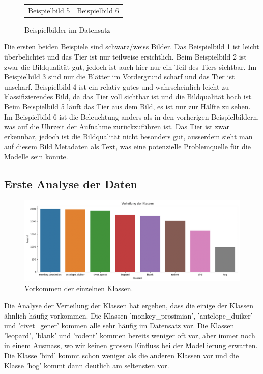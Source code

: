 \documentclass{article}
\begin{document}
\begin{figure}[!h]
\begin{tabular}{cc}
Beispielbild 5 & Beispielbild 6 \\[6pt]
\end{tabular}
\caption{\label{fig:random_pictures}Beispielbilder im Datensatz}
\end{figure}

Die ersten beiden Beispiele sind schwarz/weiss Bilder. Das Beispielbild 1 ist leicht überbelichtet und das Tier ist nur teilweise ersichtlich. Beim Beispielbild 2 ist zwar die Bildqualität gut, jedoch ist auch hier nur ein Teil des Tiers sichtbar. Im Beispielbild 3 sind nur die Blätter im Vordergrund scharf und das Tier ist unscharf. Beispielbild 4 ist ein relativ gutes und wahrscheinlich leicht zu klassifizierendes Bild, da das Tier voll sichtbar ist und die Bildqualität hoch ist.
Beim Beispielbild 5 läuft das Tier aus dem Bild, es ist nur zur Hälfte zu sehen. Im Beispielbild 6 ist die Beleuchtung anders als in den vorherigen Beispielbildern, was auf die Uhrzeit der Aufnahme zurückzuführen ist. Das Tier ist zwar erkennbar, jedoch ist die Bildqualität nicht besonders gut, ausserdem sieht man auf diesem Bild Metadaten als Text, was eine potenzielle Problemquelle für die Modelle sein könnte.

\subsection{Erste Analyse der Daten}

\begin{figure}[!h]
    \centering
    \includegraphics[width=12cm]{plots/Verteilung Klassen.png}
    \caption{\label{fig:nimber_of_images_per_class}Vorkommen der einzelnen Klassen.}
\end{figure}

Die Analyse der Verteilung der Klassen hat ergeben, dass die einige der Klassen ähnlich häufig vorkommen. Die Klassen 'monkey\_prosimian', 'antelope\_duiker' und 'civet\_gener' kommen alle sehr häufig im Datensatz vor. Die Klassen 'leopard', 'blank' und 'rodent' kommen bereits weniger oft vor, aber immer noch in einem Ausmass, wo wir keinen grossen Einfluss bei der Modellierung erwarten. Die Klasse 'bird' kommt schon weniger als die anderen Klassen vor und die Klasse 'hog' kommt dann deutlich am seltensten vor.
\end{document}
